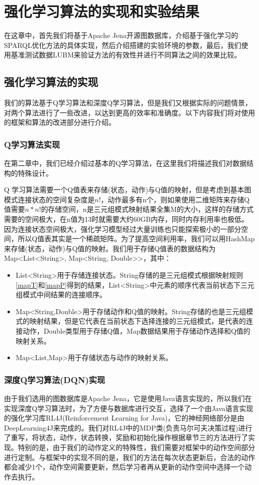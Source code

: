 \chapter{强化学习算法的实现和实验结果}
在这章中，首先我们将基于Apache Jena开源图数据库，介绍基于强化学习的SPARQL优化方法的具体实现，然后介绍搭建的实验环境的参数，最后，我们使用基准测试数据LUBM来验证方法的有效性并进行不同算法之间的效果比较。
\section{强化学习算法的实现}
我们的算法基于Q学习算法和深度Q学习算法，但是我们又根据实际的问题情景，对两个算法进行了一些改进，以达到更高的效率和准确度。以下内容我们将对使用的框架和算法的改进部分进行介绍。
\subsection{Q学习算法实现}
在第二章中，我们已经介绍过基本的Q学习算法，在这里我们将描述我们对数据结构的特殊设计。

Q 学习算法需要一个Q值表来存储(状态，动作)与Q值的映射，但是考虑到基本图模式连接状态的空间复杂度是$n!$，动作最多有n个，则如果使用二维矩阵来存储Q值需要$n*n!$的存储空间，n是三元组模式映射结果全集M的大小，这样的存储方式需要的空间极大，在n值为13时就需要大约60GB内存，同时内存利用率也极低。因为连接状态空间极大，强化学习模型经过大量训练也只能探索极小的一部分空间，所以Q值表其实是一个稀疏矩阵。为了提高空间利用率，我们可以用HashMap来存储(状态，动作)与Q值的映射。我们用于存储Q值表的数据结构为Map<List<String>, Map<String, Double>>，其中：
\begin{itemize}
    \item List<String>用于存储连接状态。String存储的是三元组模式根据映射规则\ref{mapT}和\ref{mapP}得到的结果，List<String>中元素的顺序代表当前状态下三元组模式中间结果的连接顺序。
    \item Map<String,Double>用于存储动作和Q值的映射。String存储的也是三元组模式的映射结果，但是它代表在当前状态下选择连接的三元组模式，是代表的连接动作，Double类型用于存储Q值，Map数据结果用于存储动作选择和Q值的映射关系。
    \item Map<List,Map>用于存储状态与动作的映射关系。
\end{itemize}

\subsection{深度Q学习算法(DQN)实现}
由于我们选用的图数据库是Apache Jena，它是使用Java语言实现的，所以我们在实现深度Q学习算法时，为了方便与数据库进行交互，选择了一个由Java语言实现的强化学习库RL4J(Reinforcement Learning for Java)，它的神经网络部分是由DeepLearning4J来完成的。我们对RL4J中的MDP类(负责马尔可夫决策过程)进行了重写，将状态，动作，状态转换，奖励和初始化操作根据章节三的方法进行了实现。特别的是，由于我们的动作定义的特殊性，我们需要对框架中的动作空间部分进行定制。与框架中的实现不同的是，我们的方法在每次状态更新后，合法的动作都会减少1个，动作空间需要更新，然后学习者再从更新的动作空间中选择一个动作去执行。

